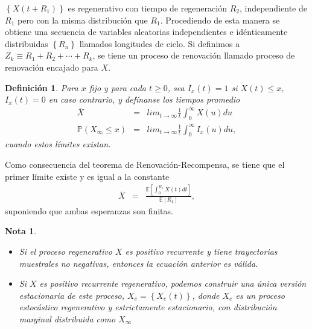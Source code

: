 \documentclass{article}
\newtheorem{Def}{Definición}
\newtheorem{Note}{Nota}
\newcommand{\esp}{\mathbb{E}}
\newcommand{\prob}{\mathbb{P}}
\begin{document}
$\left\{X\left(t+R_{1}\right)\right\}$ es regenerativo con tiempo de regeneraci\'on $R_{2}$, independiente de $R_{1}$ pero con la misma distribuci\'on que $R_{1}$. Procediendo de esta manera se obtiene una secuencia de variables aleatorias independientes e id\'enticamente distribuidas $\left\{R_{n}\right\}$ llamados longitudes de ciclo. Si definimos a $Z_{k}\equiv R_{1}+R_{2}+\cdots+R_{k}$, se tiene un proceso de renovaci\'on llamado proceso de renovaci\'on encajado para $X$.




\begin{Def}
Para $x$ fijo y para cada $t\geq0$, sea $I_{x}\left(t\right)=1$ si $X\left(t\right)\leq x$,  $I_{x}\left(t\right)=0$ en caso contrario, y def\'inanse los tiempos promedio
\begin{eqnarray*}
\overline{X}&=&lim_{t\rightarrow\infty}\frac{1}{t}\int_{0}^{\infty}X\left(u\right)du\\
\prob\left(X_{\infty}\leq x\right)&=&lim_{t\rightarrow\infty}\frac{1}{t}\int_{0}^{\infty}I_{x}\left(u\right)du,
\end{eqnarray*}
cuando estos l\'imites existan.
\end{Def}

Como consecuencia del teorema de Renovaci\'on-Recompensa, se tiene que el primer l\'imite  existe y es igual a la constante
\begin{eqnarray*}
\overline{X}&=&\frac{\esp\left[\int_{0}^{R_{1}}X\left(t\right)dt\right]}{\esp\left[R_{1}\right]},
\end{eqnarray*}
suponiendo que ambas esperanzas son finitas.

\begin{Note}
\begin{itemize}
\item[a)] Si el proceso regenerativo $X$ es positivo recurrente y tiene trayectorias muestrales no negativas, entonces la ecuaci\'on anterior es v\'alida.
\item[b)] Si $X$ es positivo recurrente regenerativo, podemos construir una \'unica versi\'on estacionaria de este proceso, $X_{e}=\left\{X_{e}\left(t\right)\right\}$, donde $X_{e}$ es un proceso estoc\'astico regenerativo y estrictamente estacionario, con distribuci\'on marginal distribuida como $X_{\infty}$
\end{itemize}
\end{Note}

\end{document}

